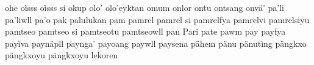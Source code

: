 \documentclass[a4paper]{article}
\begin{document}
ohe\hspace{2mm}
oìsss\hspace{2mm}
oìsss si\hspace{2mm}
okup\hspace{2mm}
olo'\hspace{2mm}
olo'eyktan\hspace{2mm}
omum\hspace{2mm}
onlor\hspace{2mm}
ontu\hspace{2mm}
ontsang\hspace{2mm}
onvä'\hspace{2mm}
pa'li\hspace{2mm}
pa'liwll\hspace{2mm}
pa'o\hspace{2mm}
pak\hspace{2mm}
palulukan\hspace{2mm}
pam\hspace{2mm}
pamrel\hspace{2mm}
pamrel si\hspace{2mm}
pamrelfya\hspace{2mm}
pamrelvi\hspace{2mm}
pamrelsiyu\hspace{2mm}
pamtseo\hspace{2mm}
pamtseo si\hspace{2mm}
pamtseotu\hspace{2mm}
pamtseowll\hspace{2mm}
pan\hspace{2mm}
Pari\hspace{2mm}
pate\hspace{2mm}
pawm\hspace{2mm}
pay\hspace{2mm}
payfya\hspace{2mm}
payìva\hspace{2mm}
paynäpll\hspace{2mm}
paynga'\hspace{2mm}
payoang\hspace{2mm}
paywll\hspace{2mm}
paysena\hspace{2mm}
pähem\hspace{2mm}
pänu\hspace{2mm}
pänutìng\hspace{2mm}
pängkxo\hspace{2mm}
pängkxoyu\hspace{2mm}
pängkxoyu lekoren\hspace{2mm}
\end{document}
